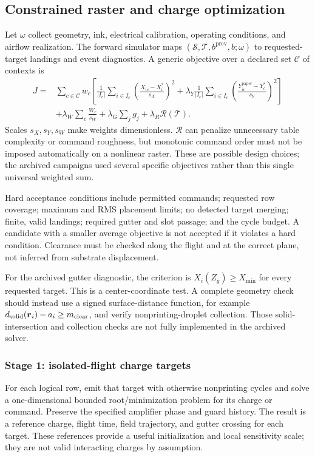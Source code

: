 \subsection{Constrained raster and charge optimization}
Let $\omega$ collect geometry, ink, electrical calibration, operating conditions, and airflow realization. The forward simulator maps $(\mathcal S,\mathcal T,b^{\mathrm{prev}},b;\omega)$ to requested-target landings and event diagnostics. A generic objective over a declared set $\mathcal C$ of contexts is
\begin{align}
 J={}&\sum_{c\in\mathcal C}w_c\left[
 \frac{1}{|I_c|}\sum_{i\in I_c}
 \left(\frac{X_{ic}-X_i^*}{s_X}\right)^2
 +\lambda_Y\frac{1}{|I_c|}\sum_{i\in I_c}
 \left(\frac{Y_{ic}^{\mathrm{paper}}-Y_c^*}{s_Y}\right)^2\right]\\
 &+\lambda_W\sum_c\frac{W_c}{s_W}+\lambda_G\sum_jg_j
 +\lambda_R\mathcal R(\mathcal T).
\label{eq:objective}
\end{align}
Scales $s_X,s_Y,s_W$ make weights dimensionless. $\mathcal R$ can penalize unnecessary table complexity or command roughness, but monotonic command order must not be imposed automatically on a nonlinear raster. These are possible design choices; the archived campaigns used several specific objectives rather than this single universal weighted sum.

Hard acceptance conditions include permitted commands; requested row coverage; maximum and RMS placement limits; no detected target merging; finite, valid landings; required gutter and slot passage; and the cycle budget. A candidate with a smaller average objective is not accepted if it violates a hard condition. Clearance must be checked along the flight and at the correct plane, not inferred from substrate displacement.

For the archived gutter diagnostic, the criterion is $X_i(Z_g)\geq X_{\min}$ for every requested target. This is a center-coordinate test. A complete geometry check should instead use a signed surface-distance function, for example $d_{\mathrm{solid}}(\boldsymbol{r}_i)-a_i\geq m_{\mathrm{clear}}$, and verify nonprinting-droplet collection. Those solid-intersection and collection checks are not fully implemented in the archived solver.

\subsubsection{Stage 1: isolated-flight charge targets}
For each logical row, emit that target with otherwise nonprinting cycles and solve a one-dimensional bounded root/minimization problem for its charge or command. Preserve the specified amplifier phase and guard history. The result is a reference charge, flight time, field trajectory, and gutter crossing for each target. These references provide a useful initialization and local sensitivity scale; they are not valid interacting charges by assumption.

